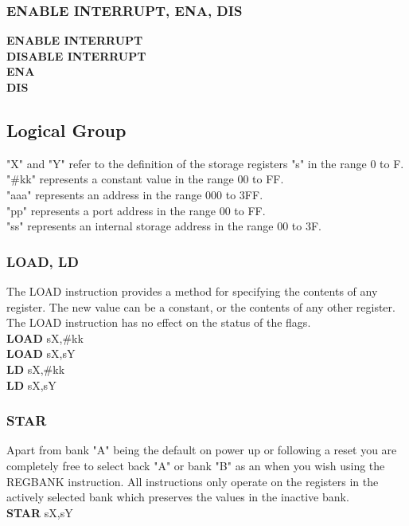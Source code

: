         \subsubsection{ENABLE INTERRUPT, ENA, DIS}
            \textbf{ENABLE INTERRUPT}\\
            \textbf{DISABLE INTERRUPT}\\
            \textbf{ENA}\\
            \textbf{DIS}\\
        \subsection{Logical Group}
            "X" and "Y" refer to the definition of the storage registers "s" in the range 0 to F.\\
            "\#kk" represents a constant value in the range 00 to FF.\\
            "aaa" represents an address in the range 000 to 3FF.\\
            "pp" represents a port address in the range 00 to FF.\\
            "ss" represents an internal storage address in the range 00 to 3F.\\
        \subsubsection{LOAD, LD}
            The LOAD instruction provides a method for specifying the contents of any register. The new value can be a constant, or the
            contents of any other register. The LOAD instruction has no effect on the status of the flags.\\
            \textbf{LOAD} sX,\#kk\\
            \textbf{LOAD} sX,sY\\
            \textbf{LD} sX,\#kk\\
            \textbf{LD} sX,sY\\
        \subsubsection{STAR}
            Apart from bank "A" being the default on power up or following a reset you are completely free to select back "A" or bank "B" as an when you wish using the
            REGBANK instruction. All instructions only operate on the registers in the actively selected bank which preserves the values in the inactive bank.\\
            \textbf{STAR} sX,sY\\

